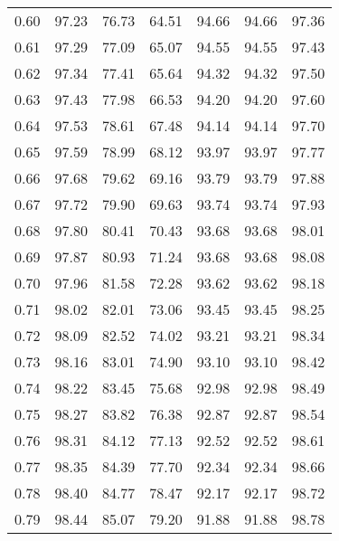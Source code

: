 \begin{tabular}{|c|c|c|c|c|c|c|}
      0.60 &     97.23 &     76.73 &      64.51 &   94.66 &      94.66 &         97.36 \\
      0.61 &     97.29 &     77.09 &      65.07 &   94.55 &      94.55 &         97.43 \\
      0.62 &     97.34 &     77.41 &      65.64 &   94.32 &      94.32 &         97.50 \\
      0.63 &     97.43 &     77.98 &      66.53 &   94.20 &      94.20 &         97.60 \\
      0.64 &     97.53 &     78.61 &      67.48 &   94.14 &      94.14 &         97.70 \\
      0.65 &     97.59 &     78.99 &      68.12 &   93.97 &      93.97 &         97.77 \\
      0.66 &     97.68 &     79.62 &      69.16 &   93.79 &      93.79 &         97.88 \\
      0.67 &     97.72 &     79.90 &      69.63 &   93.74 &      93.74 &         97.93 \\
      0.68 &     97.80 &     80.41 &      70.43 &   93.68 &      93.68 &         98.01 \\
      0.69 &     97.87 &     80.93 &      71.24 &   93.68 &      93.68 &         98.08 \\
      0.70 &     97.96 &     81.58 &      72.28 &   93.62 &      93.62 &         98.18 \\
      0.71 &     98.02 &     82.01 &      73.06 &   93.45 &      93.45 &         98.25 \\
      0.72 &     98.09 &     82.52 &      74.02 &   93.21 &      93.21 &         98.34 \\
      0.73 &     98.16 &     83.01 &      74.90 &   93.10 &      93.10 &         98.42 \\
      0.74 &     98.22 &     83.45 &      75.68 &   92.98 &      92.98 &         98.49 \\
      0.75 &     98.27 &     83.82 &      76.38 &   92.87 &      92.87 &         98.54 \\
      0.76 &     98.31 &     84.12 &      77.13 &   92.52 &      92.52 &         98.61 \\
      0.77 &     98.35 &     84.39 &      77.70 &   92.34 &      92.34 &         98.66 \\
      0.78 &     98.40 &     84.77 &      78.47 &   92.17 &      92.17 &         98.72 \\
      0.79 &     98.44 &     85.07 &      79.20 &   91.88 &      91.88 &         98.78 \\

\end{tabular}
